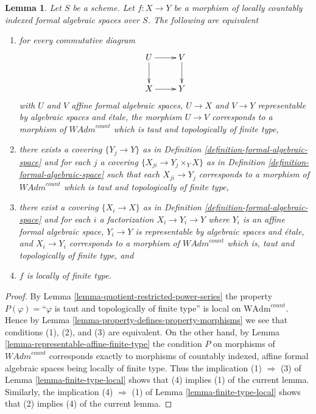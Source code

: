 \documentclass{stacks-project}
\theoremstyle{plain}
\newtheorem{lemma}[subsection]{Lemma}
\theoremstyle{definition}
\theoremstyle{remark}
\numberwithin{equation}{subsection}
\begin{document}
\begin{lemma}
\label{lemma-finite-type-local-property}
Let $S$ be a scheme. Let $f : X \to Y$ be a morphism of
locally countably indexed formal algebraic spaces over $S$.
The following are equivalent
\begin{enumerate}
\item for every commutative diagram
$$
\xymatrix{
U \ar[d] \ar[r] & V \ar[d] \\
X \ar[r] & Y
}
$$
with $U$ and $V$ affine formal algebraic spaces, $U \to X$ and $V \to Y$
representable by algebraic spaces and \'etale, the morphism $U \to V$
corresponds to a morphism of $\textit{WAdm}^{count}$ which is
taut and topologically of finite type,
\item there exists a covering $\{Y_j \to Y\}$ as in
Definition \ref{definition-formal-algebraic-space} and for each $j$
a covering $\{X_{ji} \to Y_j \times_Y X\}$ as in
Definition \ref{definition-formal-algebraic-space}
such that each $X_{ji} \to Y_j$  corresponds
to a morphism of $\textit{WAdm}^{count}$ which is
taut and topologically of finite type,
\item there exist a covering $\{X_i \to X\}$ as in
Definition \ref{definition-formal-algebraic-space}
and for each $i$ a factorization $X_i \to Y_i \to Y$ where $Y_i$
is an affine formal algebraic space, $Y_i \to Y$ is representable
by algebraic spaces and \'etale, and $X_i \to Y_i$ corresponds
to a morphism of $\textit{WAdm}^{count}$ which is,
taut and topologically of finite type, and
\item $f$ is locally of finite type.
\end{enumerate}
\end{lemma}

\begin{proof}
By Lemma \ref{lemma-quotient-restricted-power-series}
the property
$P(\varphi)=$``$\varphi$ is taut and topologically of finite type''
is local on $\text{WAdm}^{count}$. Hence by
Lemma \ref{lemma-property-defines-property-morphisms}
we see that conditions (1), (2), and (3) are equivalent.
On the other hand, by Lemma \ref{lemma-representable-affine-finite-type}
the condition $P$ on morphisms of $\textit{WAdm}^{count}$
corresponds exactly to morphisms of countably indexed, affine
formal algebraic spaces being locally of finite type.
Thus the implication (1) $\Rightarrow$ (3) of
Lemma \ref{lemma-finite-type-local}
shows that (4) implies (1) of the current lemma.
Similarly, the implication (4) $\Rightarrow$ (1) of
Lemma \ref{lemma-finite-type-local}
shows that (2) implies (4) of the current lemma.
\end{proof}
\end{document}
